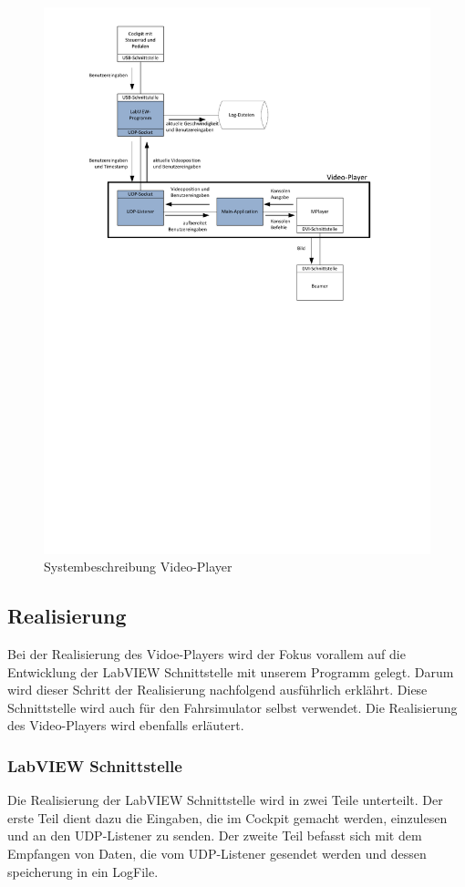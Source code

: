 \begin{figure}[H]
\centering 
\includegraphics[width=0.8\linewidth]{src/Systembeschreibung_VideoPlayer.pdf}
\caption{Systembeschreibung Video-Player} %
\label{Systembeschreibung Video-Player} %
\end{figure}

\subsection{Realisierung}
Bei der Realisierung des Vidoe-Players wird der Fokus vorallem auf die Entwicklung der LabVIEW Schnittstelle mit unserem Programm gelegt. Darum wird dieser Schritt der Realisierung nachfolgend ausführlich erklährt. Diese Schnittstelle wird auch für den Fahrsimulator selbst verwendet. Die Realisierung des Video-Players wird ebenfalls erläutert.

\subsubsection{LabVIEW Schnittstelle}
Die Realisierung der LabVIEW Schnittstelle wird in zwei Teile unterteilt. Der erste Teil dient dazu die Eingaben, die im Cockpit gemacht werden, einzulesen und an den UDP-Listener zu senden. Der zweite Teil befasst sich mit dem Empfangen von Daten, die vom UDP-Listener gesendet werden und dessen speicherung in ein LogFile. 

